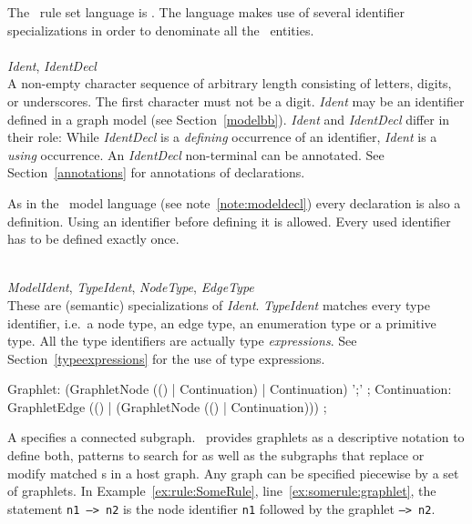 The \GrG\ rule set language is . The language makes use of several identifier specializations in order to denominate all the \GrG\ entities.\\
\\
\emph{Ident}, \emph{IdentDecl}\\ \nopagebreak
A non-empty character sequence of arbitrary length consisting of letters, digits, or underscores. The first character must not be a digit. \emph{Ident} may be an identifier defined in a graph model (see Section~\ref{modelbb}). \emph{Ident} and \emph{IdentDecl} differ in their role: While \emph{IdentDecl} is a \emph{defining} occurrence of an identifier, \emph{Ident} is a \emph{using} occurrence. An \emph{IdentDecl} non-terminal can be annotated. See Section~\ref{annotations} for annotations of declarations.
\begin{note}
  As in the \GrG\ model language (see note~\ref{note:modeldecl}) every declaration is also a definition. Using an identifier before defining it is allowed. Every used identifier has to be defined exactly once.
\end{note}
\mbox{ }\\
\emph{ModelIdent}, \emph{TypeIdent}, \emph{NodeType}, \emph{EdgeType}\\
These are (semantic) specializations of \emph{Ident}. \emph{TypeIdent} matches every type identifier, i.e.\ a node type, an edge type, an enumeration type or a primitive type. All the type identifiers are actually type \emph{expressions}. See Section~\ref{typeexpressions} for the use of type expressions.\\

\begin{rail}
  Graphlet: (GraphletNode (() | Continuation) | Continuation) ';' ;
  Continuation: GraphletEdge (() | (GraphletNode (() | Continuation))) ;
\end{rail}
A  specifies a connected subgraph. 
\GrG\ provides graphlets as a descriptive notation to define both, patterns to search for as well as the subgraphs that replace or modify matched s in a host graph. 
Any graph can be specified piecewise by a set of graphlets. 
In Example~\ref{ex:rule:SomeRule}, line~\ref{ex:somerule:graphlet}, the statement \texttt{n1 --> n2} is the node identifier \texttt{n1} followed by the  graphlet \texttt{--> n2}.

